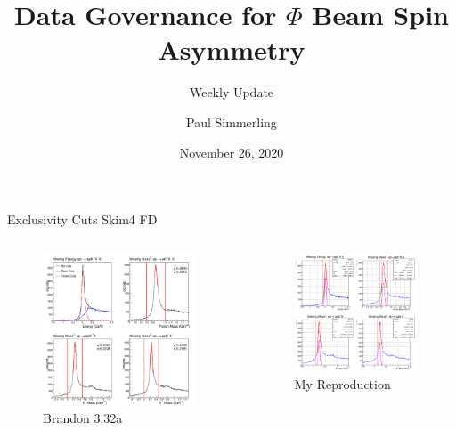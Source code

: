 \documentclass[aspectratio=169]{beamer}
\title[Data Governance for $\Phi$ BSA]{Data Governance for \texorpdfstring{$\Phi$}{Phi} Beam Spin Asymmetry}
\subtitle{Weekly Update}
\author{Paul Simmerling}
\institute[UConn]{University of Connecticut}
\date{November 26, 2020}
\begin{document}
\frame{\titlepage}


\begin{frame}{Exclusivity Cuts \hfill Skim4 FD}
\vspace*{-0.6cm}
    \begin{columns}
    \begin{figure}
        \centering
        \includegraphics[width=0.94\textwidth]{brandon_figs/32a.png}
        \caption{Brandon 3.32a}
    \end{figure}
    \begin{figure}
        \centering
        \includegraphics[width=0.97\textwidth]{pdfs/32a.png}
        \caption{My Reproduction}
    \end{figure}
    \end{columns}
\end{frame}
\end{document}
